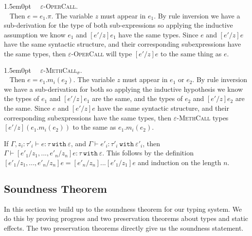\documentclass{llncs}
\newcommand{\keywadj}[1]{\mathtt{#1}}
\newcommand{\keyw}[1]{\keywadj{#1}~}
\newcommand{\proofcase}[2]{
	\begin{adjustwidth}{1.5em}{0pt}
		\fbox{Case.}~~#1. \\ ~#2
	\end{adjustwidth}
}
\begin{document}
{	\proofcase{\textsc{$\varepsilon$-OperCall}} {
		Then $e = e_1.\pi$. The variable $z$ must appear in $e_1$. By rule inversion we have a sub-derivation for the type of both sub-expressions so applying the inductive assumption we know $e_1$ and $[e'/z]e_1$ have the same types. Since $e$ and $[e'/z]e$ have the same syntactic structure, and their corresponding subexpressions have the same types, then \textsc{$\varepsilon$-OperCall} will type $[e'/z]e$ to the same thing as $e$. \\
	}

	\proofcase{\textsc{$\varepsilon$-MethCall$_\sigma$}} {
		Then $e =e _1.m_i(e_2)$. The variable $z$ must appear in $e_1$ or $e_2$. By rule inversion we have a sub-derivation for both so applying the inductive hypothesis we know the types of $e_1$ and $[e'/z]e_1$ are the same, and the types of $e_2$ and $[e'/z]e_2$ are the same. Since $e$ and $[e'/z]e$ have the same syntactic structure, and their corresponding subexpressions have the same types, then \textsc{$\varepsilon$-MethCall} types $[e'/z](e_1.m_i(e_2))$ to the same as $e_1.m_i(e_2)$.
	}
}

\noindent
{} If $\Gamma, z_i : \tau'_i \vdash e : \tau~\keyw{with} \varepsilon$, and $\Gamma \vdash e'_i : \tau'_i~\keyw{with} \varepsilon'_i$, then $\Gamma \vdash [e'_1/z_1, ..., e'_n/z_n]e : \tau~\keyw{with} \varepsilon$. This follows by the definition $[e'_1/z_1, ..., e'_n/z_n]e = [e'_n/z_n]...[e'_1/z_1]e$ and induction on the length $n$.


\subsection{Soundness Theorem}

\noindent
In this section we build up to the soundness theorem for our typing system. We do this by proving progress and two preservation theorems about types and static effects. The two preservation theorems directly give us the soundness statement.\\
 
 
 
 
 
 
 
 
 
\end{document}

